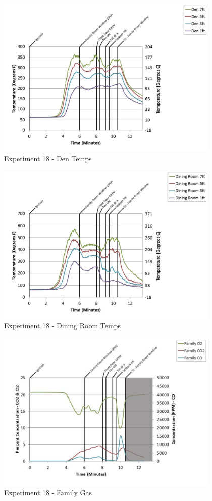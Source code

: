 \documentclass{article}
\begin{document}
\begin{appendices}
	\begin{figure}[h!]
		\centering
		\includegraphics[height=3.05in]{0_Images/Results_Charts/Exp_18_Charts/DenTemps.pdf}
		\caption{Experiment 18 - Den Temps}
	\end{figure}
 
	\clearpage

	\begin{figure}[h!]
		\centering
		\includegraphics[height=3.05in]{0_Images/Results_Charts/Exp_18_Charts/DiningRoomTemps.pdf}
		\caption{Experiment 18 - Dining Room Temps}
	\end{figure}
 

	\begin{figure}[h!]
		\centering
		\includegraphics[height=3.05in]{0_Images/Results_Charts/Exp_18_Charts/FamilyGas.pdf}
		\caption{Experiment 18 - Family Gas}
	\end{figure}
 

\end{appendices}
\end{document}
